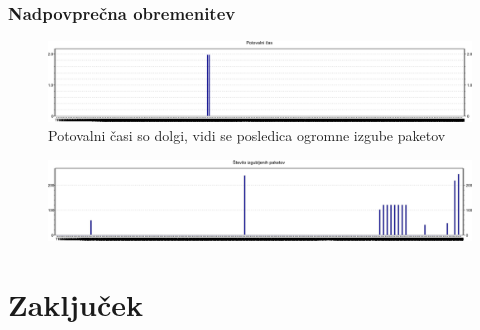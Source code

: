 \documentclass[11pt,a4paper,slovene]{myarticle}
\begin{document}
\subsubsection{Nadpovprečna obremenitev}
\begin{figure}[H]
\includegraphics[scale=0.45]{slike/tree/NADpotovalniCas.png}
\caption{Potovalni časi so dolgi, vidi se posledica ogromne izgube paketov}
\end{figure}
\begin{figure}[H]
\includegraphics[scale=0.45]{slike/tree/NADstIzgubljenihPaketov.png}
\end{figure}

\section{Zaključek}

\pagebreak


\end{document}
